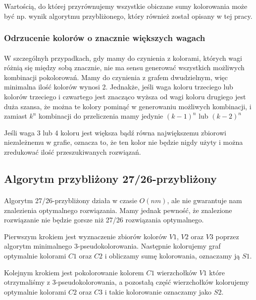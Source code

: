 \documentclass{article}
\begin{document}
Wartością, do której przyrównujemy wszystkie obiczane sumy kolorowania może być np. wynik algorytmu przybliżonego, który również został opisany w tej pracy.

\subsubsection*{Odrzucenie kolorów o znacznie większych wagach}

\paragraph{} W szczególnyh przypadkach, gdy mamy do czynienia z kolorami, których wagi różnią się między sobą znacznie, nie ma sensu generować wszystkich możliwych kombinacji pokolorowań. Mamy do czynienia z grafem dwudzielnym, więc minimalna ilość kolorów wynosi 2. Jednakże, jeśli waga koloru trzeciego lub kolorów trzeciego i czwartego jest znacząco wyższa od wagi koloru drugiego jest duża szansa, że można te kolory pominąć w generowaniu możliwych kombinacji, i zamiast $k^n$ kombinacji do przeliczenia mamy jedynie $(k-1)^n$ lub $(k-2)^n$

Jeśli waga 3 lub 4 koloru jest większa bądź równa największemu zbiorowi niezależnemu w grafie, oznacza to, że ten kolor nie będzie nigdy użyty i można zredukować ilość przeszukiwanych rozwiązań.

\subsection{Algorytm przybliżony 27/26-przybliżony}

\paragraph{} Algorytm 27/26-przybliżony działa w czasie $O(nm)$, ale nie gwarantuje nam znalezienia optymalnego rozwiązania. Mamy jednak pewność, że znalezione rozwiązanie nie będzie gorsze niż 27/26 rozwiązania optymalnego. 

Pierwszym krokiem jest wyznaczenie zbiorów kolorów $V1$, $V2$ oraz $V3$ poprzez algorytm minimalnego 3-pseudokolorowania. Następnie kolorujemy graf optymalnie kolorami $C1$ oraz $C2$ i obliczamy sumę kolorowania, oznaczamy ją $S1$. 

Kolejnym krokiem jest pokolorowanie kolorem $C1$ wierzchołków $V1$ które otrzymaliśmy z 3-pseudokolorowania, a pozostałą część wierzchołków kolorujemy optymalnie kolorami $C2$ oraz $C3$ i takie kolorowanie oznaczamy jako $S2$.
\end{document}
